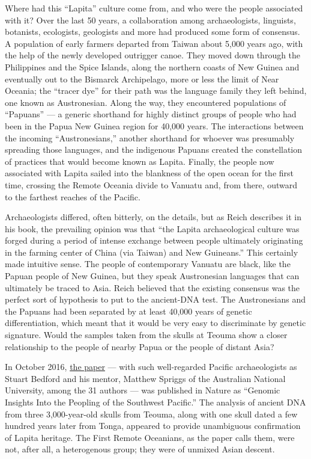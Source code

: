 Where had this ``Lapita'' culture come from, and who were the people
associated with it? Over the last 50 years, a collaboration among
archaeologists, linguists, botanists, ecologists, geologists and more
had produced some form of consensus. A population of early farmers
departed from Taiwan about 5,000 years ago, with the help of the newly
developed outrigger canoe. They moved down through the Philippines and
the Spice Islands, along the northern coasts of New Guinea and
eventually out to the Bismarck Archipelago, more or less the limit of
Near Oceania; the ``tracer dye'' for their path was the language family
they left behind, one known as Austronesian. Along the way, they
encountered populations of ``Papuans'' --- a generic shorthand for
highly distinct groups of people who had been in the Papua New Guinea
region for 40,000 years. The interactions between the incoming
``Austronesians,'' another shorthand for whoever was presumably
spreading those languages, and the indigenous Papuans created the
constellation of practices that would become known as Lapita. Finally,
the people now associated with Lapita sailed into the blankness of the
open ocean for the first time, crossing the Remote Oceania divide to
Vanuatu and, from there, outward to the farthest reaches of the Pacific.

Archaeologists differed, often bitterly, on the details, but as Reich
describes it in his book, the prevailing opinion was that ``the Lapita
archaeological culture was forged during a period of intense exchange
between people ultimately originating in the farming center of China
(via Taiwan) and New Guineans.'' This certainly made intuitive sense.
The people of contemporary Vanuatu are black, like the Papuan people of
New Guinea, but they speak Austronesian languages that can ultimately be
traced to Asia. Reich believed that the existing consensus was the
perfect sort of hypothesis to put to the ancient-DNA test. The
Austronesians and the Papuans had been separated by at least 40,000
years of genetic differentiation, which meant that it would be very easy
to discriminate by genetic signature. Would the samples taken from the
skulls at Teouma show a closer relationship to the people of nearby
Papua or the people of distant Asia?

In October 2016, \href{https://www.nature.com/articles/nature19844}{the
paper} --- with such well-regarded Pacific archaeologists as Stuart
Bedford and his mentor, Matthew Spriggs of the Australian National
University, among the 31 authors --- was published in Nature as
``Genomic Insights Into the Peopling of the Southwest Pacific.'' The
analysis of ancient DNA from three 3,000-year-old skulls from Teouma,
along with one skull dated a few hundred years later from Tonga,
appeared to provide unambiguous confirmation of Lapita heritage. The
First Remote Oceanians, as the paper calls them, were not, after all, a
heterogenous group; they were of unmixed Asian descent.

